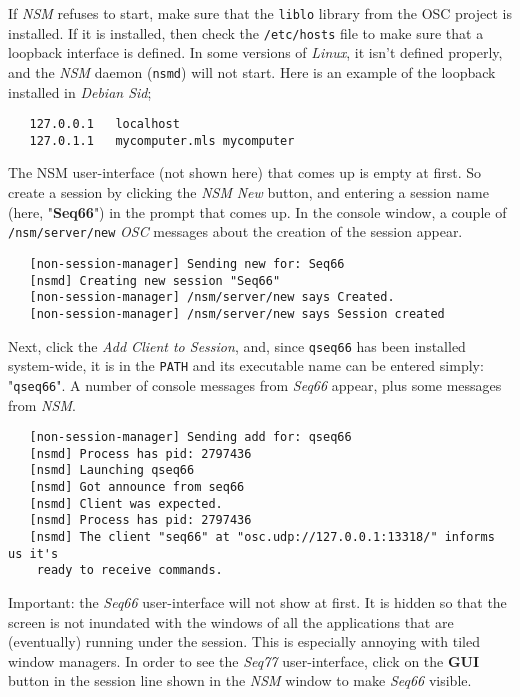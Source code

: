    If \textsl{NSM} refuses to start, make sure that the \texttt{liblo} library
   from the OSC project is installed.
   If it is installed, then check the
   \texttt{/etc/hosts} file to make sure that a loopback interface is
   defined. In some versions of \textsl{Linux}, it isn't defined properly,
   and the \textsl{NSM} daemon (\texttt{nsmd}) will not start.
   Here is an example of the loopback installed in \textsl{Debian Sid};

\begin{verbatim}
   127.0.0.1   localhost
   127.0.1.1   mycomputer.mls mycomputer
\end{verbatim}

   The NSM user-interface (not shown here) that comes up is empty at first.
   So create a session by clicking the \textsl{NSM}
   \textsl{New} button, and entering a session name
   (here, "\textbf{Seq66}") in the
   prompt that comes up.  In the console window, a couple of 
   \texttt{/nsm/server/new} \textsl{OSC} messages
   about the creation of the session appear.

\begin{verbatim}
   [non-session-manager] Sending new for: Seq66
   [nsmd] Creating new session "Seq66"
   [non-session-manager] /nsm/server/new says Created.
   [non-session-manager] /nsm/server/new says Session created
\end{verbatim}

   Next, click the \textsl{Add Client to Session}, and, since
   \texttt{qseq66} has been installed system-wide, it is in the \texttt{PATH}
   and its executable name can be entered simply: "\texttt{qseq66}".
   A number of console messages from
   \textsl{Seq66} appear, plus some messages from \textsl{NSM}.

\begin{verbatim}
   [non-session-manager] Sending add for: qseq66
   [nsmd] Process has pid: 2797436
   [nsmd] Launching qseq66
   [nsmd] Got announce from seq66
   [nsmd] Client was expected.
   [nsmd] Process has pid: 2797436
   [nsmd] The client "seq66" at "osc.udp://127.0.0.1:13318/" informs us it's
    ready to receive commands.
\end{verbatim}

   Important: the \textsl{Seq66} user-interface will not show at first.
   It is hidden so that the screen is not inundated with the windows of all the
   applications that are (eventually) running under the session.
   This is especially annoying with tiled window managers.
   In order to see the \textsl{Seq77} user-interface, click on
   the \textbf{GUI} button in the session line shown in the \textsl{NSM}
   window to make \textsl{Seq66} visible.

